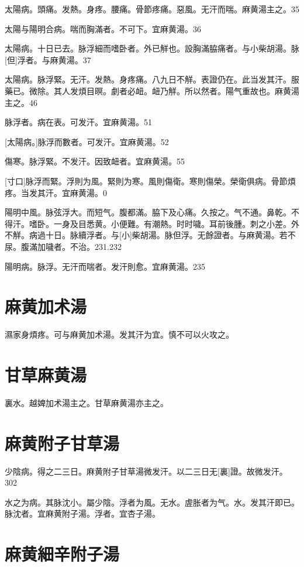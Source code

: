 \documentclass[12pt,twoside,UTF8,b5paper]{ctexbook}
\begin{document}
太陽病。頭痛。发熱。身疼。腰痛。骨節疼痛。惡風。无汗而喘。麻黄湯主之。35

太陽与陽明合病。喘而胸滿者。不可下。宜麻黄湯。36

太陽病。十日已去。脉浮細而嗜卧者。外已觧也。設胸滿脇痛者。与小柴胡湯。脉[但]浮者。与麻黄湯。37

太陽病。脉浮緊。无汗。发熱。身疼痛。八九日不觧。表證仍在。此当发其汗。服藥已。微除。其人发煩目暝。劇者必衄。衄乃觧。所以然者。陽气重故也。麻黄湯主之。46

脉浮者。病在表。可发汗。宜麻黄湯。51

[太陽病。]脉浮而數者。可发汗。宜麻黄湯。52

傷寒。脉浮緊。不发汗。因致衄者。宜麻黄湯。55

[寸口]脉浮而緊。浮則为風。緊則为寒。風則傷衛。寒則傷榮。榮衛俱病。骨節煩疼。当发其汗。宜麻黄湯。0

陽明中風。脉弦浮大。而短气。腹都滿。脇下及心痛。久按之。气不通。鼻乾。不得汗。嗜卧。一身及目悉黄。小便難。有潮熱。时时噦。耳前後腫。刺之小差。外不觧。病過十日。脉續浮者。与[小]柴胡湯。脉但浮。无餘證者。与麻黄湯。若不尿。腹滿加噦者。不治。231.232

陽明病。脉浮。无汗而喘者。发汗則愈。宜麻黄湯。235

\section{麻黄加术湯}

濕家身煩疼。可与麻黄加术湯。发其汗为宜。慎不可以火攻之。

\section{甘草麻黄湯}

裏水。越婢加术湯主之。甘草麻黄湯亦主之。

\section{麻黄附子甘草湯}

少陰病。得之二三日。麻黄附子甘草湯微发汗。以二三日无[裏]證。故微发汗。302

水之为病。其脉沈小。屬少陰。浮者为風。无水。虗胀者为气。水。发其汗即已。脉沈者。宜麻黄附子湯。浮者。宜杏子湯。

\section{麻黄細辛附子湯}
\end{document}
